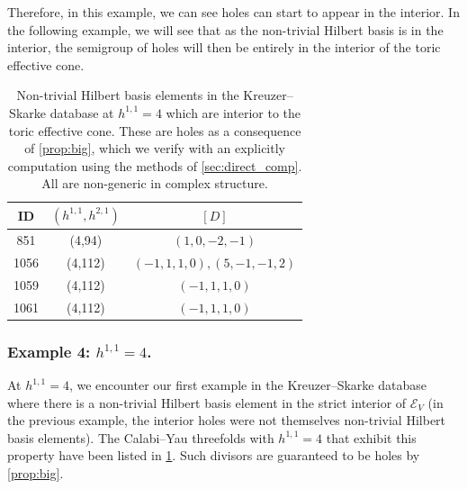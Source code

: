 \documentclass[11pt,dvipsnames]{article}
\theoremstyle{definition}
\begin{document}
Therefore, in this example, we can see holes can start to appear in the interior. In the following example, we will see that as the non-trivial Hilbert basis is in the interior, the semigroup of holes will then be entirely in the interior of the toric effective cone.

\begin{table}
    \centering
    \begin{tabular}{c|c|c}
    ID & $(h^{1,1},h^{2,1})$ & $[D]$ \\
    \hline
    851 & (4,94) & $(1, 0, -2, -1)$\\
    1056 & (4,112) & $(-1, 1, 1, 0), (5, -1, -1, 2)$\\
    1059 & (4,112) & $(-1, 1, 1, 0)$\\
    1061 & (4,112) & $(-1, 1, 1, 0)$\\
    \end{tabular}
    \caption{Non-trivial Hilbert basis elements in the Kreuzer--Skarke database at $h^{1,1}=4$ which are interior to the toric effective cone. These are holes as a consequence of \cref{prop:big}, which we verify with an explicitly computation using the methods of \cref{sec:direct_comp}. All are non-generic in complex structure.
    }
    \label{tab:h11=4}
\end{table}

\subsubsection{Example 4: $h^{1,1}=4$.} \label{sec:h11=4} 

At $h^{1,1}=4$, we encounter our first example in the Kreuzer--Skarke database where there is a non-trivial Hilbert basis element in the strict interior of $\mathcal{E}_V$ (in the previous example, the interior holes were not themselves non-trivial Hilbert basis elements). The Calabi--Yau threefolds with $h^{1,1}=4$ that exhibit this property have been listed in \cref{tab:h11=4}. Such divisors are guaranteed to be holes by \cref{prop:big}.
\end{document}
